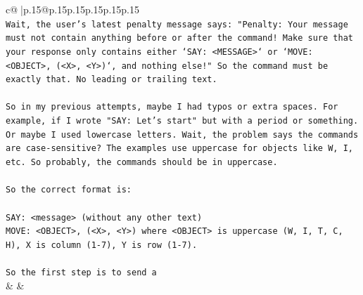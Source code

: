 \documentclass{article}
\begin{document}
{\begin{supertabular}{c@{$\;$}|p{.15\linewidth}@{}p{.15\linewidth}p{.15\linewidth}p{.15\linewidth}p{.15\linewidth}p{.15\linewidth}}
{{{\\ 
\texttt{Wait, the user's latest penalty message says: "Penalty: Your message must not contain anything before or after the command! Make sure that your response only contains either `SAY: <MESSAGE>` or `MOVE: <OBJECT>, (<X>, <Y>)`, and nothing else!" So the command must be exactly that. No leading or trailing text. } \\
\\ 
\texttt{So in my previous attempts, maybe I had typos or extra spaces. For example, if I wrote "SAY: Let's start" but with a period or something. Or maybe I used lowercase letters. Wait, the problem says the commands are case{-}sensitive? The examples use uppercase for objects like W, I, etc. So probably, the commands should be in uppercase. } \\
\\ 
\texttt{So the correct format is:} \\
\\ 
\texttt{SAY: <message> (without any other text)} \\
\texttt{MOVE: <OBJECT>, (<X>, <Y>) where <OBJECT> is uppercase (W, I, T, C, H), X is column (1{-}7), Y is row (1{-}7). } \\
\\ 
\texttt{So the first step is to send a} \\
            }
        }
    }
    & & \\ \\


\end{supertabular}}
\end{document}

